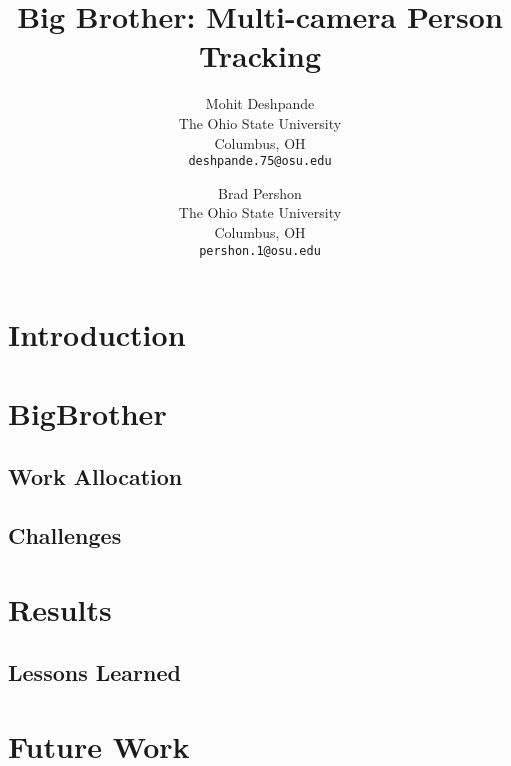 \documentclass[10pt,twocolumn,letterpaper]{article}
\begin{document}
\title{Big Brother: Multi-camera Person Tracking}

\author{Mohit Deshpande\\
The Ohio State University\\
Columbus, OH\\
{\tt\small deshpande.75@osu.edu}
\and
Brad Pershon\\
The Ohio State University\\
Columbus, OH\\
{\tt\small pershon.1@osu.edu}
}

\maketitle

\begin{abstract}
    \lipsum[1]
\end{abstract}

\section{Introduction}
\lipsum[1-5]

\section{BigBrother}
\lipsum[1-5]

\subsection{Work Allocation}
\lipsum[1-5]

\subsection{Challenges}
\lipsum[1-5]

\section{Results}
\lipsum[1-5]

\subsection{Lessons Learned}
\lipsum[1-5]

\section{Future Work}
\lipsum[1-5]


{\small


}
\end{document}
